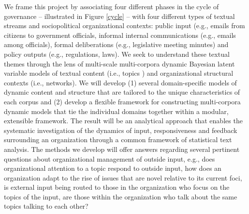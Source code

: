 We frame this project by associating four different phases in the cycle of governance -- illustrated in Figure \ref{cycle} -- with four different types of textual streams and sociopolitical organizational contexts: public input (e.g., emails from citizens to government officials, informal internal communications (e.g., emails among officials), formal deliberations (e.g., legislative meeting minutes) and policy outputs (e.g., regulations, laws). We seek to understand these textual themes through the lens of multi-scale multi-corpora dynamic Bayesian latent variable models of textual content (i.e., topics \cite{Blei2003}) and organizational structural contexts (i.e., networks). We will develop (1) several domain-specific models of dynamic content and structure that are tailored to the unique characteristics of each corpus and (2) develop a flexible framework for constructing multi-corpora dynamic models that tie the individual domains together within a modular, extensible framework. The result will be an analytical approach that enables the systematic investigation of the dynamics of input, responsiveness and feedback surrounding an organization through a common framework of statistical text analysis.  The methods we develop will offer answers regarding several pertinent questions about organizational management of outside input, e.g., does organizational attention to a topic respond to outside input, how does an organization adapt to the rise of issues that are novel relative to its current foci, is external input being routed to those in the organization who focus on the topics of the input, are those within the organization who talk about the same topics talking to each other?

